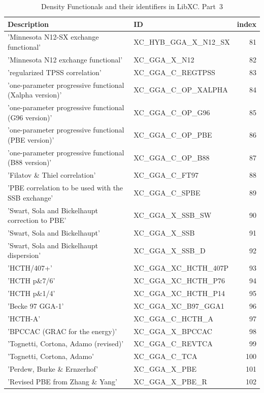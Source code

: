 \documentclass[final,12pt,makeidx,DIV=calc]{article}
\begin{document}
{{{{{{\begin{table}[!h]
\caption{Density Functionals and their identifiers in LibXC. Part~3}
\begin{center}
\begin{tabular}{llr}
\hline
\hline
Description & ID & index\\
\hline
  'Minnesota N12-SX exchange functional' & XC\_HYB\_GGA\_X\_N12\_SX  & 81\\
  'Minnesota N12 exchange functional' & XC\_GGA\_X\_N12  & 82\\
  'regularized TPSS correlation' & XC\_GGA\_C\_REGTPSS  & 83\\
  'one-parameter progressive functional (Xalpha version)' & XC\_GGA\_C\_OP\_XALPHA  & 84\\
  'one-parameter progressive functional (G96 version)' & XC\_GGA\_C\_OP\_G96  & 85\\
  'one-parameter progressive functional (PBE version)' & XC\_GGA\_C\_OP\_PBE  & 86\\
  'one-parameter progressive functional (B88 version)' & XC\_GGA\_C\_OP\_B88  & 87\\
  'Filatov \& Thiel correlation' & XC\_GGA\_C\_FT97  & 88\\
  'PBE correlation to be used with the SSB exchange' & XC\_GGA\_C\_SPBE  & 89\\
  'Swart, Sola and Bickelhaupt correction to PBE' & XC\_GGA\_X\_SSB\_SW  & 90\\
  'Swart, Sola and Bickelhaupt' & XC\_GGA\_X\_SSB  & 91\\
  'Swart, Sola and Bickelhaupt dispersion' & XC\_GGA\_X\_SSB\_D  & 92\\
  'HCTH/407+' & XC\_GGA\_XC\_HCTH\_407P  & 93\\
  'HCTH p\&7/6' & XC\_GGA\_XC\_HCTH\_P76  & 94\\
  'HCTH p\&1/4' & XC\_GGA\_XC\_HCTH\_P14  & 95\\
  'Becke 97 GGA-1' & XC\_GGA\_XC\_B97\_GGA1  & 96\\
  'HCTH-A' & XC\_GGA\_C\_HCTH\_A  & 97\\
  'BPCCAC (GRAC for the energy)' & XC\_GGA\_X\_BPCCAC  & 98\\
  'Tognetti, Cortona, Adamo (revised)' & XC\_GGA\_C\_REVTCA  & 99\\
  'Tognetti, Cortona, Adamo' & XC\_GGA\_C\_TCA  &100\\
  'Perdew, Burke \& Ernzerhof' & XC\_GGA\_X\_PBE  &101\\
  'Revised PBE from Zhang \& Yang' & XC\_GGA\_X\_PBE\_R  &102\\

\end{tabular}
\end{center}
\end{table}}}}}}}
\end{document}

